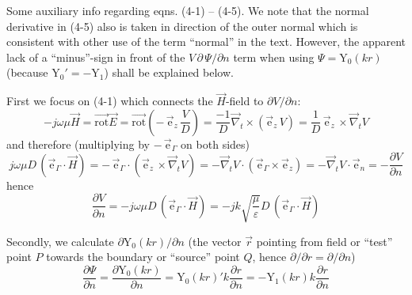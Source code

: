 \documentclass[10pt,notitlepage,letterpaper,landscape,twocolumn]{article}
\newcommand{\besY}{\mathrm{Y}}
\newcommand{\rot}{\vec{\mathrm{rot}}}
\newcommand{\ez}{\vec{\mathrm{e}}_z}
\newcommand{\eg}{\vec{\mathrm{e}}_\Gamma}
\newcommand{\en}{\vec{\mathrm{e}}_n}
\newcommand{\nabt}{\vec{\nabla}_t}
\begin{document}
\noindent
Some auxiliary info regarding eqns. (4-1) -- (4-5). We note that the normal
derivative in (4-5) also is taken in direction of the outer normal
which is consistent with other use of the term ``normal'' in the text.
However, the apparent
lack of a ``minus''-sign in front of the $V\, \partial\,\Psi/\partial n$ term
when using $\Psi=\besY_0(kr)$ (because $\besY_0' = -\besY_1$) shall be explained below.

First we focus on (4-1) which connects the $\vec{H}$-field to
$\partial V/\partial n$:
\begin{displaymath}
    -j\omega\mu\vec{H} = \rot \vec{E}
  = \rot \left(-\,\ez\,\frac{V}{D}\right)
  = \frac{-1}{D} \nabt \times ( \ez\, V )
  = \frac{1}{D}\,\ez\, \times \nabt V
\end{displaymath}
and therefore (multiplying by $-\,\eg$ on both sides)
\begin{displaymath}
     j\omega\mu D\, (\eg\cdot\vec{H})
  = -\,\eg\cdot(\ez\,\times\nabt V)
  = -\nabt V \cdot (\eg\times\ez)
  = -\nabt V \cdot \en
  = -\frac{\partial V}{\partial n}
\end{displaymath}
hence
\begin{equation}
\label{eqn:eqn1}
    \frac{\partial V}{\partial n}
  = -j\omega\mu D\, (\eg\cdot\vec{H})
  = -j k \sqrt{\frac{\mu}{\varepsilon}} D\, (\eg\cdot\vec{H})
\end{equation}

Secondly, we calculate $\partial \besY_0(kr)/\partial n$ (the vector $\vec{r}$
pointing from field or ``test'' point $P$ towards the boundary or ``source''
point $Q$, hence 
$\partial/\partial r=\partial/\partial n$)
\begin{equation}
\label{eqn:eqn2}
	\frac{\partial \Psi}{\partial n}
  = \frac{\partial \besY_0(kr)}{\partial n}
  = \besY_0(kr)' k \frac{\partial r}{\partial n}
  = - \besY_1(kr) k \frac{\partial r}{\partial n}
\end{equation}
\end{document}

